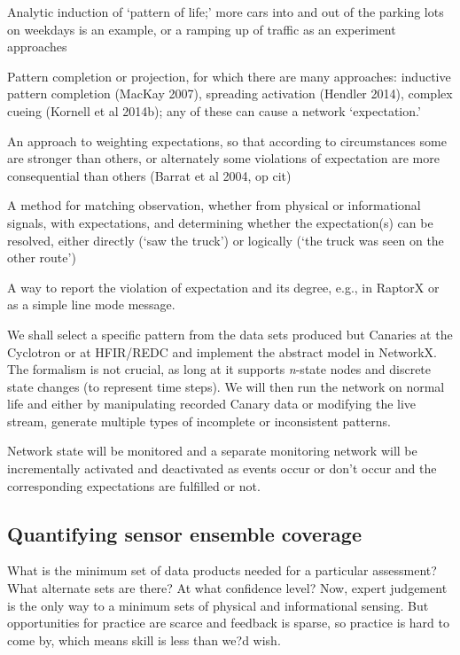 \documentclass{article} %
\begin{document}
\begin{enumerate*}
\item Analytic induction of `pattern of life;' more cars into and out of the parking lots on weekdays is an example, or a ramping up of traffic as an experiment approaches
\item Pattern completion or projection, for which there are many approaches: inductive pattern completion (MacKay 2007), spreading activation (Hendler 2014), complex cueing (Kornell et al 2014b); any of these can cause a network `expectation.'
\item An approach to weighting expectations, so that according to circumstances some are stronger than others, or alternately some violations of expectation are more consequential than others (Barrat et al 2004, op cit)
\item A method for matching observation, whether from physical or informational signals, with expectations, and determining whether the expectation(s) can be resolved, either directly (`saw the truck') or logically (`the truck was seen on the other route')
\item A way to report the violation of expectation and its degree, e.g., in RaptorX or as a simple line mode message.
\end{enumerate*}

We shall select a specific pattern from the data sets produced but Canaries at the Cyclotron or at HFIR/REDC and implement the abstract model in NetworkX. The formalism is not crucial, as long at it supports \textit{n}-state nodes and discrete state changes (to represent time steps). We will then run the network on normal life and either by manipulating recorded Canary data or modifying the live stream, generate multiple types of incomplete or inconsistent patterns.

Network state will be monitored and a separate monitoring network will be incrementally activated and deactivated as events occur or don't occur and the corresponding expectations are fulfilled or not.

\subsection{Quantifying sensor ensemble coverage}
What is the minimum set of data products needed for a particular assessment? What alternate sets are there? At what confidence level? Now, expert judgement is the only way to a minimum sets of physical and informational sensing. But opportunities for practice are scarce and feedback is sparse, so practice is hard to come by, which means skill is less than we?d wish.
\end{document}
